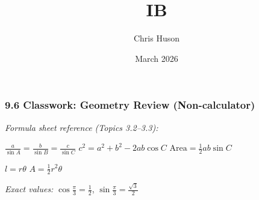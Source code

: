 \documentclass[12pt, twoside]{article}
\title{IB}
\author{Chris Huson}
\date{March 2026}
\begin{document}
\thispagestyle{firstpage}

\subsubsection*{9.6 Classwork: Geometry Review (Non-calculator)}

\textit{Formula sheet reference (Topics 3.2--3.3):}
\begin{center}
$\displaystyle \frac{a}{\sin A} = \frac{b}{\sin B} = \frac{c}{\sin C}$
\qquad
$c^2 = a^2 + b^2 - 2ab\cos C$
\qquad
$\text{Area} = \frac{1}{2}ab\sin C$

\vspace{0.3cm}
$l = r\theta$ \qquad $A = \frac{1}{2}r^2\theta$
\end{center}

\vspace{0.1cm}
\textit{Exact values:} $\displaystyle \cos\frac{\pi}{3} = \frac{1}{2}$, \quad $\displaystyle \sin\frac{\pi}{3} = \frac{\sqrt{3}}{2}$
\end{document}
